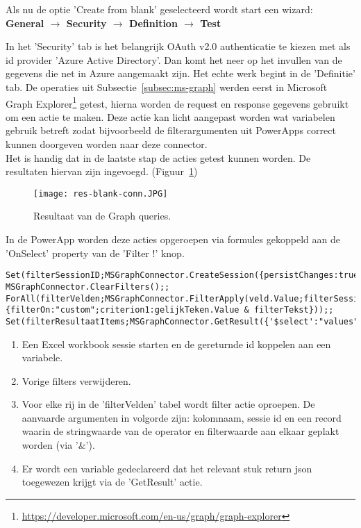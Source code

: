 Als nu de optie 'Create from blank' geselecteerd wordt start een wizard:\\ 
\textbf{General $\rightarrow$ Security $\rightarrow$ Definition $\rightarrow$ Test}

In het 'Security' tab is het belangrijk OAuth v2.0 authenticatie te kiezen met als id provider 'Azure Active Directory'. Dan komt het neer op het invullen van de gegevens die net in Azure aangemaakt zijn. Het echte werk begint in de 'Definitie' tab. De operaties uit Subsectie~\ref{subsec:ms-graph} werden eerst in Microsoft Graph Explorer\footnote{\url{https://developer.microsoft.com/en-us/graph/graph-explorer}} getest, hierna worden de request en response gegevens gebruikt om een actie te maken. Deze actie kan licht aangepast worden wat variabelen gebruik betreft zodat bijvoorbeeld de filterargumenten uit PowerApps correct kunnen doorgeven worden naar deze connector.\\
Het is handig dat in de laatste stap de acties getest kunnen worden. De resultaten hiervan zijn ingevoegd. (Figuur~\ref{fig:res-blank-conn})

\begin{figure}[h!]
    \centering
    \texttt{[image: res-blank-conn.JPG]}
    \caption{Resultaat van de Graph queries.}
    \label{fig:res-blank-conn}
\end{figure}

In de PowerApp worden deze acties opgeroepen via formules gekoppeld aan de 'OnSelect' property van de 'Filter !' knop.
\begin{lstlisting}
Set(filterSessionID;MSGraphConnector.CreateSession({persistChanges:true}).id);;
MSGraphConnector.ClearFilters();;
ForAll(filterVelden;MSGraphConnector.FilterApply(veld.Value;filterSessionID;{filterOn:"custom";criterion1:gelijkTeken.Value & filterTekst}));;
Set(filterResultaatItems;MSGraphConnector.GetResult({'$select':"values"}).value);;
\end{lstlisting}
\begin{enumerate}
    \item Een Excel workbook sessie starten en de gereturnde id koppelen aan een variabele.
    \item Vorige filters verwijderen.
    \item Voor elke rij in de 'filterVelden' tabel wordt filter actie oproepen. De aanvaarde argumenten in volgorde zijn: kolomnaam, sessie id en een record waarin de stringwaarde van de operator en filterwaarde aan elkaar geplakt worden (via '\&').
    \item Er wordt een variable gedeclareerd dat het relevant stuk return json toegewezen krijgt via de 'GetResult' actie.
\end{enumerate}

